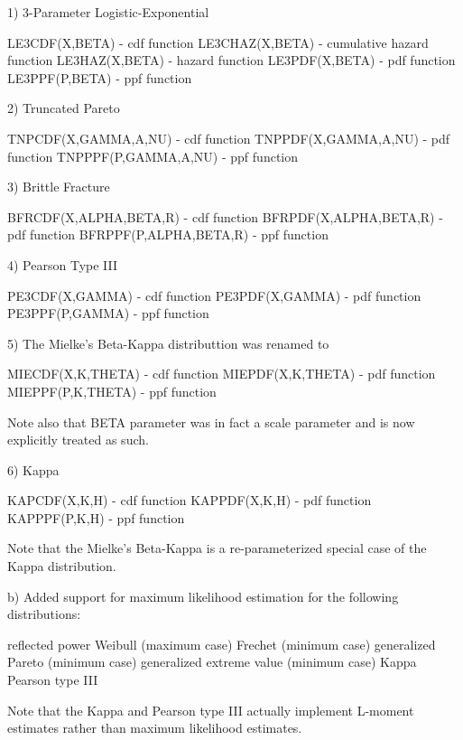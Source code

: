 {       1) 3-Parameter Logistic-Exponential

           LE3CDF(X,BETA)                - cdf function
           LE3CHAZ(X,BETA)               - cumulative hazard function
           LE3HAZ(X,BETA)                - hazard function
           LE3PDF(X,BETA)                - pdf function
           LE3PPF(P,BETA)                - ppf function
 
       2) Truncated Pareto

           TNPCDF(X,GAMMA,A,NU)          - cdf function
           TNPPDF(X,GAMMA,A,NU)          - pdf function
           TNPPPF(P,GAMMA,A,NU)          - ppf function
 
       3) Brittle Fracture

           BFRCDF(X,ALPHA,BETA,R)        - cdf function
           BFRPDF(X,ALPHA,BETA,R)        - pdf function
           BFRPPF(P,ALPHA,BETA,R)        - ppf function
 
       4) Pearson Type III

           PE3CDF(X,GAMMA)               - cdf function
           PE3PDF(X,GAMMA)               - pdf function
           PE3PPF(P,GAMMA)               - ppf function

       5) The Mielke's Beta-Kappa distributtion was
          renamed to

           MIECDF(X,K,THETA)            - cdf function
           MIEPDF(X,K,THETA)            - pdf function
           MIEPPF(P,K,THETA)            - ppf function

          Note also that BETA parameter was in fact a
          scale parameter and is now explicitly treated
          as such.

       6) Kappa

           KAPCDF(X,K,H)                 - cdf function
           KAPPDF(X,K,H)                 - pdf function
           KAPPPF(P,K,H)                 - ppf function

          Note that the Mielke's Beta-Kappa is a
          re-parameterized special case of the Kappa
          distribution.

    b) Added support for maximum likelihood estimation for
       the following distributions:

       reflected power
       Weibull (maximum case)
       Frechet (minimum case)
       generalized Pareto (minimum case)
       generalized extreme value (minimum case)
       Kappa
       Pearson type III

       Note that the Kappa  and Pearson type III actually
       implement L-moment estimates rather than maximum
       likelihood estimates.

}
